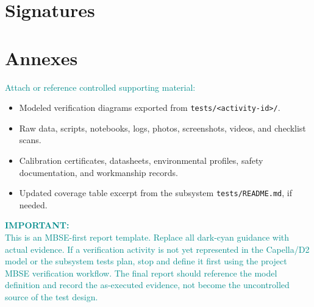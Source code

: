 \documentclass{../common/latex/delta_base_styles/delta_base_styles}
\newcommand{\placeholder}[1]{\textcolor{DarkCyan}{#1}}
\begin{document}
\section{Signatures}

\makeatletter
{}
\makeatother

\section{Annexes}
\placeholder{Attach or reference controlled supporting material:}
\begin{itemize}
  \item Modeled verification diagrams exported from \texttt{tests/<activity-id>/}.
  \item Raw data, scripts, notebooks, logs, photos, screenshots, videos, and checklist scans.
  \item Calibration certificates, datasheets, environmental profiles, safety documentation, and workmanship records.
  \item Updated coverage table excerpt from the subsystem \texttt{tests/README.md}, if needed.
\end{itemize}

\vspace{2cm}
\begin{center}
\Huge \textcolor{DarkCyan}{\textbf{IMPORTANT:} \\[0.5cm]}
\large
\textcolor{DarkCyan}{This is an MBSE-first report template. Replace all dark-cyan guidance with actual evidence. If a verification activity is not yet represented in the Capella/D2 model or the subsystem tests plan, stop and define it first using the project MBSE verification workflow. The final report should reference the model definition and record the as-executed evidence, not become the uncontrolled source of the test design.}
\end{center}
\end{document}
